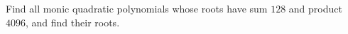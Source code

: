 Find all monic quadratic polynomials whose roots have sum $128$ and product $4096$, and find their roots.
